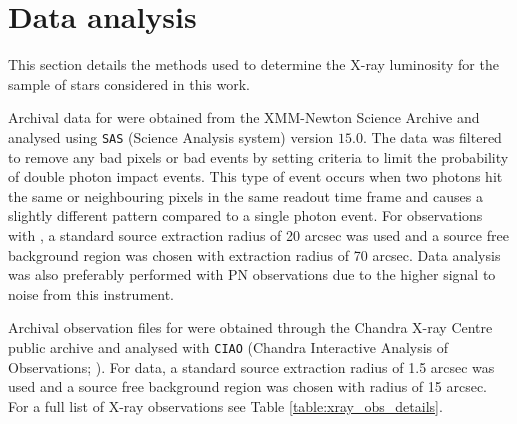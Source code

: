 \section{Data analysis}
This section details the methods used to determine the X-ray luminosity for the sample of stars considered in this work.

Archival data for \XMM were obtained from the XMM-Newton Science Archive and analysed using \texttt{SAS} (Science Analysis system) version $15.0$. The data was filtered to remove any bad pixels or bad events by setting criteria to limit the probability of double photon impact events. This type of event occurs when two photons hit the same or neighbouring pixels in the same readout time frame and causes a slightly different pattern compared to a single photon event. For observations with \XMM, a standard source extraction radius of 20 arcsec was used and a source free background region was chosen with extraction radius of 70 arcsec. Data analysis was also preferably performed with PN observations due to the higher signal to noise from this instrument.

Archival observation files for \Chandra were obtained through the Chandra X-ray Centre public archive and analysed with \texttt{CIAO} (Chandra Interactive Analysis of Observations; \citealt{Fruscione_etal_2006}). For \Chandra data, a standard source extraction radius of 1.5 arcsec was used and a source free background region was chosen with radius of 15 arcsec. For a full list of X-ray observations see Table \ref{table:xray_obs_details}.

